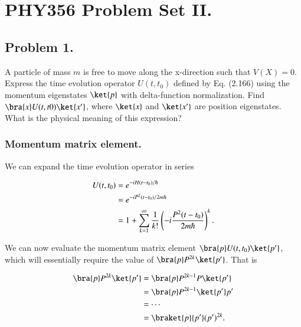 %
%
%
%
%
%

\chapter{PHY356 Problem Set II.}
\label{chap:qmIproblemSet1}
\date{Oct 23, 2010}

\beginArtNoToc
\section{Problem 1.}

A particle of mass $m$ is free to move along the x-direction such that $V(X)=0$. Express the time evolution operator $U(t,t_0)$ defined by Eq. (2.166) using the momentum eigenstates $\ket{p}$ with delta-function normalization. Find $\bra{x} U(t,t0) \ket{x'}$,  where $\ket{x}$ and $\ket{x'}$ are position eigenstates.  What is the physical meaning of this expression?

\subsection{Momentum matrix element.}

We can expand the time evolution operator in series

\begin{align*}
U(t,t_0) 
&= e^{-i H(t-t_0)/\hbar} \\
&= e^{ -i P^2 (t-t_0)/ 2m \hbar } \\
&= 1 + \sum_{k=1}^\infty \frac{1}{k!} \left( -i \frac{P^2 (t-t_0)}{2m \hbar} \right)^k.
\end{align*}

We can now evaluate the momentum matrix element $\bra{p} U(t,t_0) \ket{p'}$, which will essentially require the value of $\bra{p} P^{2k} \ket{p'}$.  That is

\begin{align*}
\bra{p} P^{2k} \ket{p'}
&= \bra{p} P^{2k-1} P \ket{p'} \\
&= \bra{p} P^{2k-1} \ket{p'} p' \\
&= \cdots \\
&= \braket{p}{p'} (p')^{2k}.
\end{align*}


